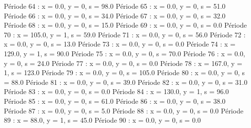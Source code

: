 Période 64 : x = 0.0, y = 0, s = 98.0
Période 65 : x = 0.0, y = 0, s = 51.0
Période 66 : x = 0.0, y = 0, s = 34.0
Période 67 : x = 0.0, y = 0, s = 32.0
Période 68 : x = 0.0, y = 0, s = 15.0
Période 69 : x = 0.0, y = 0, s = 0.0
Période 70 : x = 105.0, y = 1, s = 59.0
Période 71 : x = 0.0, y = 0, s = 56.0
Période 72 : x = 0.0, y = 0, s = 13.0
Période 73 : x = 0.0, y = 0, s = 0.0
Période 74 : x = 129.0, y = 1, s = 90.0
Période 75 : x = 0.0, y = 0, s = 70.0
Période 76 : x = 0.0, y = 0, s = 24.0
Période 77 : x = 0.0, y = 0, s = 0.0
Période 78 : x = 167.0, y = 1, s = 123.0
Période 79 : x = 0.0, y = 0, s = 105.0
Période 80 : x = 0.0, y = 0, s = 88.0
Période 81 : x = 0.0, y = 0, s = 39.0
Période 82 : x = 0.0, y = 0, s = 31.0
Période 83 : x = 0.0, y = 0, s = 0.0
Période 84 : x = 130.0, y = 1, s = 96.0
Période 85 : x = 0.0, y = 0, s = 61.0
Période 86 : x = 0.0, y = 0, s = 38.0
Période 87 : x = 0.0, y = 0, s = 5.0
Période 88 : x = 0.0, y = 0, s = 0.0
Période 89 : x = 88.0, y = 1, s = 45.0
Période 90 : x = 0.0, y = 0, s = 0.0

